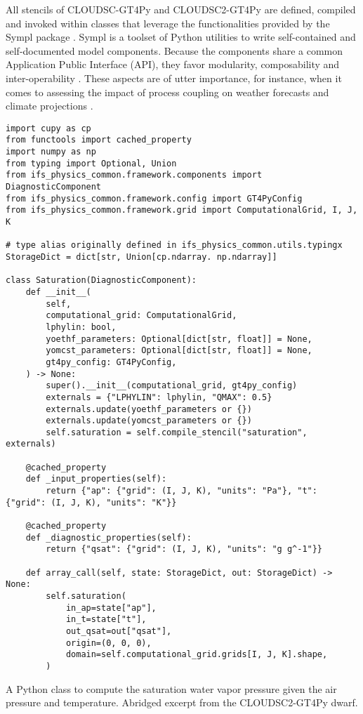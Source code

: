 \documentclass[main.tex]{subfiles}
\begin{document}
        All stencils of CLOUDSC-GT4Py and CLOUDSC2-GT4Py are defined, compiled and invoked within classes that leverage the functionalities provided by the Sympl package \citep{monteiro18}. Sympl is a toolset of Python utilities to write self-contained and self-documented model components. Because the components share a common Application Public Interface (API), they favor modularity, composability and inter-operability \citep{schaer19}. These aspects are of utter importance, for instance, when it comes to assessing the impact of process coupling on weather forecasts and climate projections \citep{ubbiali21}.

        \begin{listing}[t!]
            \begin{verbatim}
import cupy as cp
from functools import cached_property
import numpy as np
from typing import Optional, Union
from ifs_physics_common.framework.components import DiagnosticComponent
from ifs_physics_common.framework.config import GT4PyConfig
from ifs_physics_common.framework.grid import ComputationalGrid, I, J, K

# type alias originally defined in ifs_physics_common.utils.typingx
StorageDict = dict[str, Union[cp.ndarray. np.ndarray]]

class Saturation(DiagnosticComponent):
    def __init__(
        self,
        computational_grid: ComputationalGrid,
        lphylin: bool,
        yoethf_parameters: Optional[dict[str, float]] = None,
        yomcst_parameters: Optional[dict[str, float]] = None,
        gt4py_config: GT4PyConfig,
    ) -> None:
        super().__init__(computational_grid, gt4py_config)
        externals = {"LPHYLIN": lphylin, "QMAX": 0.5}
        externals.update(yoethf_parameters or {})
        externals.update(yomcst_parameters or {})
        self.saturation = self.compile_stencil("saturation", externals)

    @cached_property
    def _input_properties(self):
        return {"ap": {"grid": (I, J, K), "units": "Pa"}, "t": {"grid": (I, J, K), "units": "K"}}

    @cached_property
    def _diagnostic_properties(self):
        return {"qsat": {"grid": (I, J, K), "units": "g g^-1"}}

    def array_call(self, state: StorageDict, out: StorageDict) -> None:
        self.saturation(
            in_ap=state["ap"],
            in_t=state["t"],
            out_qsat=out["qsat"],
            origin=(0, 0, 0),
            domain=self.computational_grid.grids[I, J, K].shape,
        )
            \end{verbatim}

            \caption{A Python class to compute the saturation water vapor pressure given the air pressure and temperature. Abridged excerpt from the CLOUDSC2-GT4Py dwarf.}
            \label{lst:saturation-infrastructure}
        \end{listing}
\end{document}
